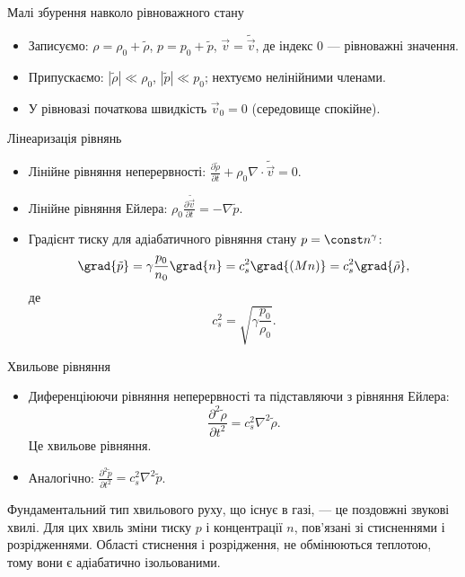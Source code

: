 \documentclass[]{beamer}
\begin{document}
\begin{frame}{Малі збурення навколо рівноважного стану}
	\begin{itemize}
		\item Записуємо: $\rho=\rho_0+\tilde{\rho}$, $p=p_0+\tilde{p}$, $\vec{v}=\tilde{\vec{v}}$, де індекс $0$ --- рівноважні значення.
		\item Припускаємо: $|\tilde{\rho}|\ll \rho_0$, $|\tilde{p}|\ll p_0$; нехтуємо нелінійними членами.
		\item У рівновазі початкова швидкість $\vec{v}_0=0$ (середовище спокійне).
	\end{itemize}
\end{frame}

\begin{frame}{Лінеаризація рівнянь}
	\begin{itemize}
		\item Лінійне рівняння неперервності: $\displaystyle \frac{\partial \tilde{\rho}}{\partial t} + \rho_0 \nabla \cdot \tilde{\vec{v}} = 0$.
		\item Лінійне рівняння Ейлера: $\displaystyle \rho_0 \frac{\partial \tilde{\vec{v}}}{\partial t} = -\nabla \tilde{p}$.
		\item Градієнт тиску для адіабатичного рівняння стану $p = \const n^{\gamma}$:
		      \begin{equation*}
			      \grad{\tilde{p}} = \gamma\frac{p_0}{n_0}\grad{n} = c_s^2 \grad{(Mn)}  = c_s^2 \grad{\tilde{\rho}},
		      \end{equation*}
		      де
		      \begin{equation*}
			      c_s^2 = \sqrt{\gamma\frac{p_0}{\rho_0}}.
		      \end{equation*}
	\end{itemize}
\end{frame}

\begin{frame}{Хвильове рівняння}
	\begin{itemize}
		\item Диференціюючи рівняння неперервності та підставляючи з рівняння Ейлера:
		      \begin{equation*}
			      \frac{\partial^2 \tilde{\rho}}{\partial t^2} = c_s^2 \nabla^2 \tilde{\rho}.
		      \end{equation*}
		      Це хвильове рівняння.
		\item Аналогічно: $\frac{\partial^2 \tilde{p}}{\partial t^2} = c_s^2 \nabla^2 \tilde{p}$.
	\end{itemize}
	\begin{block}{}\justifying
		Фундаментальний тип хвильового руху, що існує в газі, --- це поздовжні звукові хвилі. Для цих хвиль зміни тиску $p$ і концентрації $n$, пов'язані зі стисненнями і розрідженнями. Області стиснення і розрідження,  не обмінюються теплотою, тому вони є адіабатично ізольованими.

	\end{block}
\end{frame}
\end{document}

